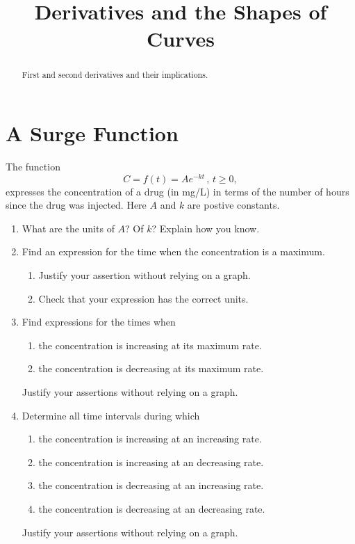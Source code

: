 \documentclass{ximera}
\title{Derivatives and the Shapes of Curves}
\begin{document}
\begin{abstract}
First and second derivatives and their implications.
\end{abstract}
\maketitle

\section{A Surge Function}
\begin{question}  \label{Q56hnnhfgh}
The function
\[
      C = f(t) = A e^{-kt} \, , \, t\geq 0 ,
\]
expresses the concentration of a drug (in mg/L) in terms of the number of hours since the drug was injected. Here $A$ and $k$ are postive constants.

\begin{enumerate}
\item What are the units of $A$? Of $k$? Explain how you know.



\item Find an expression for the time when the concentration is a maximum.

\begin{enumerate}
\item Justify your assertion without relying on a graph.

\item Check that your expression has the correct units.
\end{enumerate}

\item Find expressions for the times when
\begin{enumerate}
\item the concentration is increasing at its maximum rate.

\item the concentration is decreasing at its maximum rate.

\end{enumerate}
Justify your assertions without relying on a graph.


\item Determine all time intervals during which 

\begin{enumerate}
\item the concentration is increasing at an increasing rate.

\item the concentration is increasing at an decreasing rate.

\item the concentration is decreasing at an increasing rate.

\item the concentration is decreasing at an decreasing rate.

\end{enumerate}
Justify your assertions without relying on a graph.
\end{enumerate}
\end{question}
\end{document}
